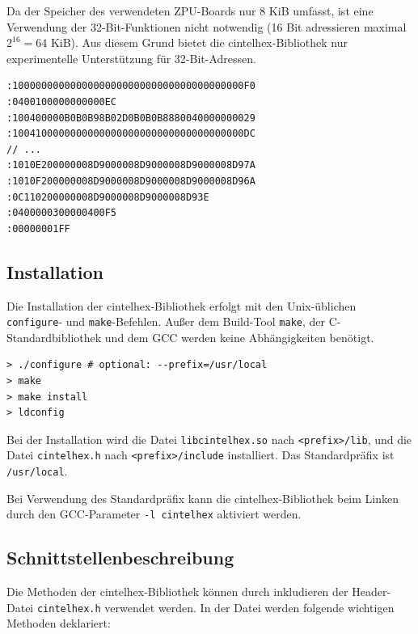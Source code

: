 \documentclass[12pt]{scrartcl}
\begin{document}
Da der Speicher des verwendeten ZPU-Boards nur 8 KiB umfasst, ist eine Verwendung der 32-Bit-Funktionen nicht notwendig (16 Bit adressieren maximal $2^{16} = 64$ KiB). Aus diesem Grund bietet die cintelhex-Bibliothek nur experimentelle Unterstützung für 32-Bit-Adressen.

\begin{lstlisting}[caption=Beispiel einer Intel HEX-Eingabedatei]
:1000000000000000000000000000000000000000F0
:0400100000000000EC
:100400000B0B0B98B02D0B0B0B8880040000000029
:1004100000000000000000000000000000000000DC
// ...
:1010E200000008D9000008D9000008D9000008D97A
:1010F200000008D9000008D9000008D9000008D96A
:0C110200000008D9000008D9000008D93E
:0400000300000400F5
:00000001FF
\end{lstlisting}

\subsection{Installation}

Die Installation der cintelhex-Bibliothek erfolgt mit den Unix-üblichen \texttt{configure}- und \texttt{make}-Befehlen. Außer dem Build-Tool \texttt{make}, der C-Standardbibliothek und dem GCC werden keine Abhängigkeiten benötigt.

\begin{lstlisting}[caption=Installation der cintelhex-Bibliothek]
> ./configure # optional: --prefix=/usr/local
> make
> make install
> ldconfig
\end{lstlisting}

Bei der Installation wird die Datei \texttt{libcintelhex.so} nach \texttt{<prefix>/lib}, und die Datei \texttt{cintelhex.h} nach \texttt{<prefix>/include} installiert. Das Standardpräfix ist \texttt{/usr/local}.

Bei Verwendung des Standardpräfix kann die cintelhex-Bibliothek beim Linken durch den GCC-Parameter \texttt{-l cintelhex} aktiviert werden.

\subsection{Schnittstellenbeschreibung}

Die Methoden der cintelhex-Bibliothek können durch inkludieren der Header-Datei \texttt{cintelhex.h} verwendet werden. In der Datei werden folgende wichtigen Methoden deklariert:
\end{document}
